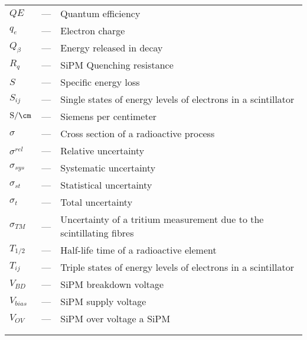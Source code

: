 \begin{longtable}{p{25mm} c p{120mm} }
$QE$ & --- & Quantum efficiency\\
$q_{e}$ & --- & Electron charge\\
$Q_\beta$ & --- & Energy released in decay\\
$R_q$ & --- & SiPM Quenching resistance\\
$S$ & --- & Specific energy loss\\
$S_{ij}$ & --- & Single states of energy levels of electrons in a 
\newline
scintillator\\
$\text{S}/\cm$ & --- & Siemens per centimeter\\
$\sigma$ & --- & Cross section of a radioactive process\\
$\sigma^{rel}$ & --- & Relative uncertainty\\
$\sigma_{sys}$ & --- & Systematic uncertainty\\
$\sigma_{st}$ & --- & Statistical uncertainty\\
$\sigma_{t}$ & --- & Total uncertainty\\
$\sigma_{TM}$ & --- & Uncertainty of a tritium measurement
\newline
due to the scintillating fibres\\
$T_{1/2}$ & --- & Half-life time of a radioactive element\\
$T_{ij}$ & --- & Triple states of energy levels of electrons in a 
\newline
scintillator\\
$V_{BD}$ & --- & SiPM breakdown voltage\\
$V_{bias}$ & --- & SiPM supply voltage\\
$V_{OV}$ & --- & SiPM over voltage a SiPM\\
\\
\\

\end{longtable}
